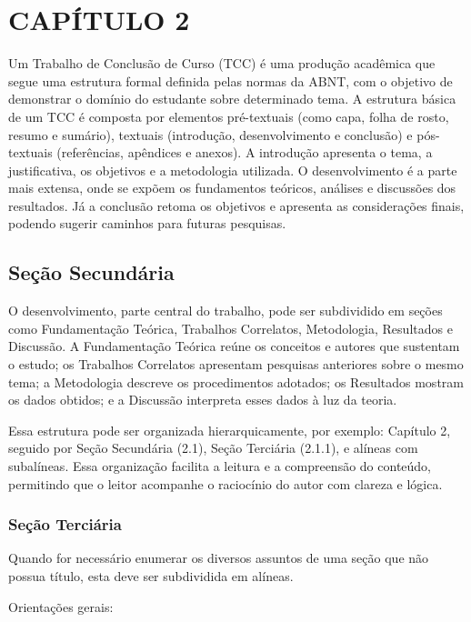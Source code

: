 
\chapter{CAPÍTULO 2}

  Um Trabalho de Conclusão de Curso (TCC) é uma produção acadêmica que segue uma estrutura formal definida pelas normas da ABNT, com o objetivo de demonstrar o domínio do estudante sobre determinado tema. A estrutura básica de um TCC é composta por elementos pré-textuais (como capa, folha de rosto, resumo e sumário), textuais (introdução, desenvolvimento e conclusão) e pós-textuais (referências, apêndices e anexos). A introdução apresenta o tema, a justificativa, os objetivos e a metodologia utilizada. O desenvolvimento é a parte mais extensa, onde se expõem os fundamentos teóricos, análises e discussões dos resultados. Já a conclusão retoma os objetivos e apresenta as considerações finais, podendo sugerir caminhos para futuras pesquisas.

  \section{Seção Secundária}

    O desenvolvimento, parte central do trabalho, pode ser subdividido em seções como Fundamentação Teórica, Trabalhos Correlatos, Metodologia, Resultados e Discussão. A Fundamentação Teórica reúne os conceitos e autores que sustentam o estudo; os Trabalhos Correlatos apresentam pesquisas anteriores sobre o mesmo tema; a Metodologia descreve os procedimentos adotados; os Resultados mostram os dados obtidos; e a Discussão interpreta esses dados à luz da teoria.

    Essa estrutura pode ser organizada hierarquicamente, por exemplo: Capítulo 2, seguido por Seção Secundária (2.1), Seção Terciária (2.1.1), e alíneas com subalíneas. Essa organização facilita a leitura e a compreensão do conteúdo, permitindo que o leitor acompanhe o raciocínio do autor com clareza e lógica.

    \subsection{Seção Terciária}

      Quando for necessário enumerar os diversos assuntos de uma seção que não possua título, esta deve ser subdividida em alíneas.

      Orientações gerais:

